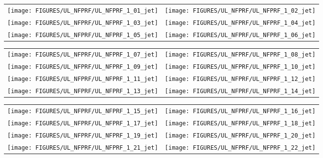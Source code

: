 \begin{figure}[h!]
\begin{tabular*}{\textwidth}{l@{\extracolsep{\fill}}r}
\texttt{[image: FIGURES/UL\_NFPRF/UL\_NFPRF\_1\_01\_jet]} &
\texttt{[image: FIGURES/UL\_NFPRF/UL\_NFPRF\_1\_02\_jet]} \\
\texttt{[image: FIGURES/UL\_NFPRF/UL\_NFPRF\_1\_03\_jet]} &
\texttt{[image: FIGURES/UL\_NFPRF/UL\_NFPRF\_1\_04\_jet]} \\
\texttt{[image: FIGURES/UL\_NFPRF/UL\_NFPRF\_1\_05\_jet]} &
\texttt{[image: FIGURES/UL\_NFPRF/UL\_NFPRF\_1\_06\_jet]}
\end{tabular*}
\label{UL_NFPRF_jet_1}
\end{figure}

\newpage

\begin{figure}[p]
\begin{tabular*}{\textwidth}{l@{\extracolsep{\fill}}r}
\texttt{[image: FIGURES/UL\_NFPRF/UL\_NFPRF\_1\_07\_jet]} &
\texttt{[image: FIGURES/UL\_NFPRF/UL\_NFPRF\_1\_08\_jet]} \\
\texttt{[image: FIGURES/UL\_NFPRF/UL\_NFPRF\_1\_09\_jet]} &
\texttt{[image: FIGURES/UL\_NFPRF/UL\_NFPRF\_1\_10\_jet]} \\
\texttt{[image: FIGURES/UL\_NFPRF/UL\_NFPRF\_1\_11\_jet]} &
\texttt{[image: FIGURES/UL\_NFPRF/UL\_NFPRF\_1\_12\_jet]} \\
\texttt{[image: FIGURES/UL\_NFPRF/UL\_NFPRF\_1\_13\_jet]} &
\texttt{[image: FIGURES/UL\_NFPRF/UL\_NFPRF\_1\_14\_jet]}
\end{tabular*}
\label{UL_NFPRF_jet_2}
\end{figure}

\begin{figure}[p]
\begin{tabular*}{\textwidth}{l@{\extracolsep{\fill}}r}
\texttt{[image: FIGURES/UL\_NFPRF/UL\_NFPRF\_1\_15\_jet]} &
\texttt{[image: FIGURES/UL\_NFPRF/UL\_NFPRF\_1\_16\_jet]} \\
\texttt{[image: FIGURES/UL\_NFPRF/UL\_NFPRF\_1\_17\_jet]} &
\texttt{[image: FIGURES/UL\_NFPRF/UL\_NFPRF\_1\_18\_jet]} \\
\texttt{[image: FIGURES/UL\_NFPRF/UL\_NFPRF\_1\_19\_jet]} &
\texttt{[image: FIGURES/UL\_NFPRF/UL\_NFPRF\_1\_20\_jet]} \\
\texttt{[image: FIGURES/UL\_NFPRF/UL\_NFPRF\_1\_21\_jet]} &
\texttt{[image: FIGURES/UL\_NFPRF/UL\_NFPRF\_1\_22\_jet]}
\end{tabular*}
\label{UL_NFPRF_jet_3}
\end{figure}


